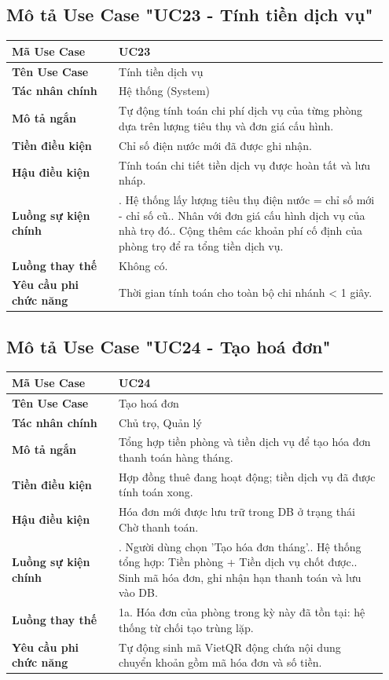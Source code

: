 \documentclass[a4paper,oneside]{report}
\begin{document}
\subsection{Mô tả Use Case "UC23 - Tính tiền dịch vụ"}

\begin{longtable}[]{@{}>{\RaggedRight\arraybackslash}p{0.27\linewidth}>{\RaggedRight\arraybackslash}p{0.68\linewidth}@{}}
\toprule
\textbf{Mã Use Case} & UC23\tabularnewline
\midrule
\endhead
\textbf{Tên Use Case} & Tính tiền dịch vụ\tabularnewline
\textbf{Tác nhân chính} & Hệ thống (System)\tabularnewline
\textbf{Mô tả ngắn} & Tự động tính toán chi phí dịch vụ của từng phòng
dựa trên lượng tiêu thụ và đơn giá cấu hình.\tabularnewline
\textbf{Tiền điều kiện} & Chỉ số điện nước mới đã được ghi
nhận.\tabularnewline
\textbf{Hậu điều kiện} & Tính toán chi tiết tiền dịch vụ được hoàn tất
và lưu nháp.\tabularnewline
\textbf{Luồng sự kiện chính} & 1. Hệ thống lấy lượng
tiêu thụ điện nước = chỉ số mới - chỉ số cũ.\newline 2. Nhân với
đơn giá cấu hình dịch vụ của nhà trọ đó.\newline 3. Cộng thêm các
khoản phí cố định của phòng trọ để ra tổng tiền dịch
vụ.\tabularnewline
\textbf{Luồng thay thế} & Không có.\tabularnewline
\textbf{Yêu cầu phi chức năng} & Thời gian tính toán cho toàn bộ chi
nhánh \textless{} 1 giây.\tabularnewline
\bottomrule
\end{longtable}

\subsection{Mô tả Use Case "UC24 - Tạo hoá đơn"}

\begin{longtable}[]{@{}>{\RaggedRight\arraybackslash}p{0.27\linewidth}>{\RaggedRight\arraybackslash}p{0.68\linewidth}@{}}
\toprule
\textbf{Mã Use Case} & UC24\tabularnewline
\midrule
\endhead
\textbf{Tên Use Case} & Tạo hoá đơn\tabularnewline
\textbf{Tác nhân chính} & Chủ trọ, Quản lý\tabularnewline
\textbf{Mô tả ngắn} & Tổng hợp tiền phòng và tiền dịch vụ để tạo hóa đơn
thanh toán hàng tháng.\tabularnewline
\textbf{Tiền điều kiện} & Hợp đồng thuê đang hoạt động; tiền dịch vụ đã
được tính toán xong.\tabularnewline
\textbf{Hậu điều kiện} & Hóa đơn mới được lưu trữ trong DB ở trạng thái
Chờ thanh toán.\tabularnewline
\textbf{Luồng sự kiện chính} & 1. Người dùng chọn
'Tạo hóa đơn tháng'.\newline 2. Hệ thống tổng hợp: Tiền phòng +
Tiền dịch vụ chốt được.\newline 3. Sinh mã hóa đơn, ghi nhận hạn
thanh toán và lưu vào DB.\tabularnewline
\textbf{Luồng thay thế} & 1a. Hóa đơn của phòng trong kỳ này đã tồn tại:
hệ thống từ chối tạo trùng lặp.\tabularnewline
\textbf{Yêu cầu phi chức năng} & Tự động sinh mã VietQR động chứa nội
dung chuyển khoản gồm mã hóa đơn và số tiền.\tabularnewline
\bottomrule
\end{longtable}
\end{document}
